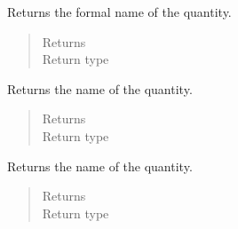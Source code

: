 \documentclass[letterpaper,10pt,openany,oneside,english]{sphinxmanual}
\begin{document}
\begin{fulllineitems}
\begin{fulllineitems}
\label{\detokenize{support_rst/quantity:quantity.Quantity.formal_name}}
Returns the formal name of the quantity.
\begin{quote}\begin{description}
\item[{Returns}] \leavevmode
{}

\item[{Return type}] \leavevmode
{}

\end{description}\end{quote}

\end{fulllineitems}


\begin{fulllineitems}
\label{\detokenize{support_rst/quantity:quantity.Quantity.get_name}}
Returns the name of the quantity.
\begin{quote}\begin{description}
\item[{Returns}] \leavevmode
{}

\item[{Return type}] \leavevmode
{}

\end{description}\end{quote}

\end{fulllineitems}


\begin{fulllineitems}
\label{\detokenize{support_rst/quantity:quantity.Quantity.name}}
Returns the name of the quantity.
\begin{quote}\begin{description}
\item[{Returns}] \leavevmode
{}

\item[{Return type}] \leavevmode
{}


\end{description}
\end{quote}
\end{fulllineitems}
\end{fulllineitems}
\end{document}
